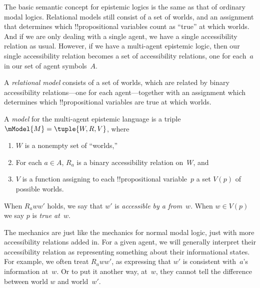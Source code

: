 \documentclass[../../../include/open-logic-section]{subfiles}
\begin{document}


The basic semantic concept for epistemic logics is the same as that of
ordinary modal logics. Relational models still consist of a set of
worlds, and an assignment that determines which !!{propositional
variable}s count as ``true'' at which worlds. And if we are only
dealing with a single agent, we have a single accessibility relation
as usual. However, if we have a multi-agent epistemic logic, then our
single accessibility relation becomes a set of accessibility
relations, one for each~$a$ in our set of agent symbols~$A$.

A \emph{relational model} consists of a set of worlds, which are
related by binary accessibility relations---one for each
agent---together with an assignment which determines which
!!{propositional variable}s are true at which worlds.

\begin{defn}
  A \emph{model} for the multi-agent epistemic language is a triple
  $\mModel{M} = \tuple{W, R, V}$, where
  \begin{enumerate}
  \item $W$ is a nonempty set of ``worlds,''
  \item For each $a \in A$, ${R}_a$ is a binary accessibility relation
  on~$W$, and
  \item $V$ is a function assigning to each !!{propositional
    variable}~$p$ a set $V(p)$ of possible worlds.
  \end{enumerate}
  When $R_a ww'$ holds, we say that $w'$ is \emph{accessible by a
    from}~$w$. When $w \in V(p)$ we say $p$ is \emph{true at}~$w$.
\end{defn}

The mechanics are just like the mechanics for normal modal logic, just
with more accessibility relations added in. For a given agent, we will
generally interpret their accessibility relation as representing
something about their informational states. For example, we often
treat $R_a ww'$, as expressing that $w'$ is consistent with~$a$'s
information at~$w$. Or to put it another way, at~$w$, they cannot tell
the difference between world $w$ and world~$w'$.  
\end{document}

